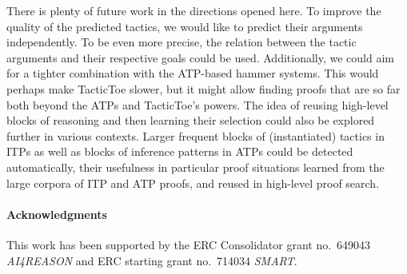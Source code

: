 \documentclass[runningheads,a4paper,draft]{svjour3}
\def\tactictoe{\textsf{TacticToe}\xspace}
\begin{document}
There is plenty of future work in the directions opened here.
To improve the quality of the predicted tactics, 
we would like to predict their arguments independently.
To be even more precise, the relation between the 
tactic arguments and their respective goals could be used.
Additionally, we could aim for a tighter combination with the ATP-based hammer
systems. This would perhaps make \tactictoe slower, but it might allow
finding proofs that are so far both beyond the ATPs and \tactictoe's
powers. The idea of reusing high-level blocks of reasoning and
then learning their selection could also be explored
further in various contexts. Larger frequent blocks of (instantiated) tactics
in ITPs as well as blocks of inference patterns in ATPs could be detected
automatically, their
usefulness in particular proof situations learned from the large corpora of
ITP and ATP proofs, and reused in high-level proof search.


\paragraph{Acknowledgments}\label{sect:acks}
This work has been supported by the
ERC Consolidator grant no.\ 649043 \textit{AI4REASON} and ERC starting
grant no.\ 714034 \textit{SMART}.



\end{document}
